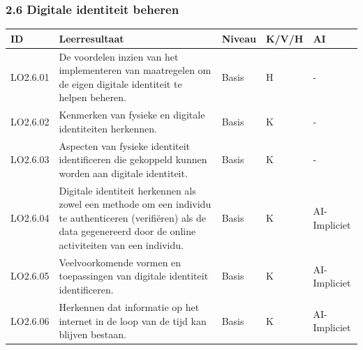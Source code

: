 \documentclass[
  dutch,
  letterpaper,
  DIV=11,
  numbers=noendperiod]{scrartcl}
\begin{document}
\subsubsection{2.6 Digitale identiteit
beheren}\label{digitale-identiteit-beheren}

\begin{longtable}[]{@{}
  >{\centering\arraybackslash}p{}
  >{\centering\arraybackslash}p{}
  >{\centering\arraybackslash}p{}
  >{\centering\arraybackslash}p{}
  >{\centering\arraybackslash}p{}@{}}
\toprule\noalign{}
\begin{minipage}[b]{\linewidth}\centering
ID
\end{minipage} & \begin{minipage}[b]{\linewidth}\centering
Leerresultaat
\end{minipage} & \begin{minipage}[b]{\linewidth}\centering
Niveau
\end{minipage} & \begin{minipage}[b]{\linewidth}\centering
K/V/H
\end{minipage} & \begin{minipage}[b]{\linewidth}\centering
AI
\end{minipage} \\
\midrule\noalign{}
\endhead
\bottomrule\noalign{}
\endlastfoot
LO2.6.01 & De voordelen inzien van het implementeren van maatregelen om
de eigen digitale identiteit te helpen beheren. & Basis & H & - \\
LO2.6.02 & Kenmerken van fysieke en digitale identiteiten herkennen. &
Basis & K & - \\
LO2.6.03 & Aspecten van fysieke identiteit identificeren die gekoppeld
kunnen worden aan digitale identiteit. & Basis & K & - \\
LO2.6.04 & Digitale identiteit herkennen als zowel een methode om een
individu te authenticeren (verifiëren) als de data gegenereerd door de
online activiteiten van een individu. & Basis & K & AI-Impliciet \\
LO2.6.05 & Veelvoorkomende vormen en toepassingen van digitale
identiteit identificeren. & Basis & K & AI-Impliciet \\
LO2.6.06 & Herkennen dat informatie op het internet in de loop van de
tijd kan blijven bestaan. & Basis & K & AI-Impliciet \\

\end{longtable}
\end{document}
